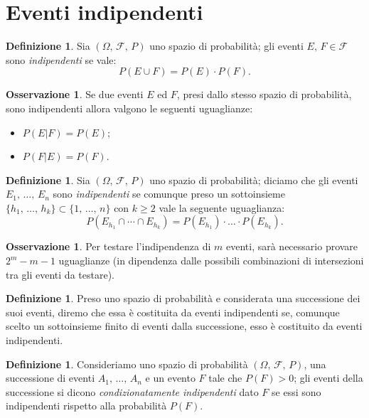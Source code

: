 \documentclass[12pt,openany]{amsbook}
\theoremstyle{plain}
\numberwithin{equation}{section} %
\theoremstyle{definition}
\newtheorem{defn}[thm]{Definizione}
\newtheorem{obsv}[thm]{Osservazione}
\begin{document}
        \section{Eventi indipendenti}
            \begin{defn}\label{defn:Eventi_indipendenti}
                Sia $(\Omega,\,\mathscr{F},\,P)$ uno spazio di probabilità; gli eventi $E,\,F \in \mathscr{F}$ sono \textit{indipendenti} se vale: \[
                    P(E \cup F) = P(E) \cdot P(F)
                .\] 
            \end{defn}
            \begin{obsv}
                Se due eventi $E$ ed $F$, presi dallo stesso spazio di probabilità, sono indipendenti allora valgono le seguenti uguaglianze:
                \begin{itemize}
                    \item $P(E|F) = P(E)$;
                    \item $P(F|E) = P(F)$.
                \end{itemize}
            \end{obsv}
            \begin{defn}
                Sia $(\Omega,\,\mathscr{F},\,P)$ uno spazio di probabilità; diciamo che gli eventi $E_1,\, \ldots,\, E_n$ sono \textit{indipendenti} se comunque preso un sottoinsieme $\{h_1,\, \ldots,\, h_k\} \subset \{1,\, \ldots,\, n\}$ con $k \geq 2$ vale la seguente uguaglianza: \[
                    P(E_{h_1} \cap \dotsm \cap E_{h_k}) = P(E_{h_1}) \cdot \ldots \cdot P(E_{h_k})
                .\] 
            \end{defn}
            \begin{obsv}
                Per testare l'indipendenza di $m$ eventi, sarà necessario provare $2^{m} - m - 1$ uguaglianze (in dipendenza dalle possibili combinazioni di intersezioni tra gli eventi da testare).
            \end{obsv}
            \begin{defn}
                Preso uno spazio di probabilità e considerata una successione dei suoi eventi, diremo che essa è costituita da eventi indipendenti se, comunque scelto un sottoinsieme finito di eventi dalla successione, esso è costituito da eventi indipendenti.
            \end{defn}
            \begin{defn}
                Consideriamo uno spazio di probabilità $(\Omega,\,\mathscr{F},\,P)$, una successione di eventi $A_1,\, \ldots,\, A_n$ e un evento $F$ tale che $P(F) > 0$; gli eventi della successione si dicono \textit{condizionatamente indipendenti} dato $F$ se essi sono indipendenti rispetto alla probabilità $P(F)$.
            \end{defn}
\end{document}
